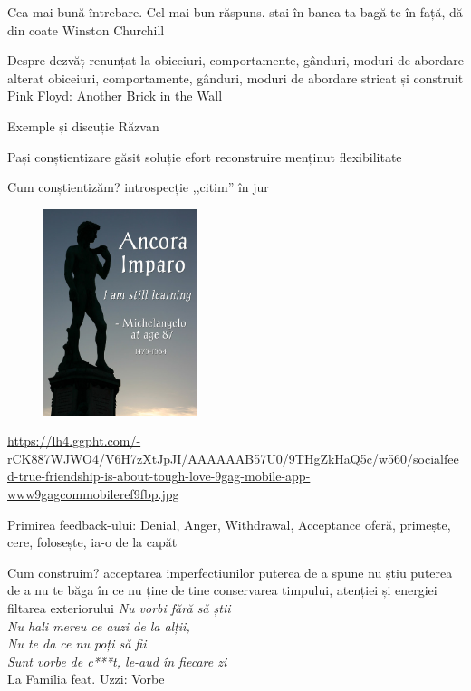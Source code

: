 \documentclass{beamer}
\begin{document}
\begin{frame}{Cea mai bună întrebare. Cel mai bun răspuns.}
  stai în banca ta
  bagă-te în față, dă din coate
  Winston Churchill
\end{frame}

\begin{frame}{Despre dezvăț}
  renunțat la obiceiuri, comportamente, gânduri, moduri de abordare
  alterat obiceiuri, comportamente, gânduri, moduri de abordare
  stricat și construit
  Pink Floyd: Another Brick in the Wall
\end{frame}

\begin{frame}{Exemple și discuție}
  Răzvan
\end{frame}

\begin{frame}{Pași}
  conștientizare
  găsit soluție
  efort
  reconstruire
  menținut flexibilitate
\end{frame}

\begin{frame}{Cum conștientizăm?}
  introspecție
  ,,citim'' în jur
  \begin{figure}
    \centering
    \includegraphics[width=0.4\textwidth]{img/michelangelo-ancora-imparo.jpg}
  \end{figure}
  \begin{center}
    \scriptsize
    \url{https://lh4.ggpht.com/-rCK887WJWO4/V6H7zXtJpJI/AAAAAAB57U0/9THgZkHaQ5c/w560/socialfeed-true-friendship-is-about-tough-love-9gag-mobile-app-www9gagcommobileref9fbp.jpg}
  \end{center}
  Primirea feedback-ului: Denial, Anger, Withdrawal, Acceptance
  oferă, primește, cere, folosește, ia-o de la capăt
\end{frame}

\begin{frame}{Cum construim?}
  acceptarea imperfecțiunilor
  puterea de a spune nu știu
  puterea de a nu te băga în ce nu ține de tine
  conservarea timpului, atenției și energiei
  filtarea exteriorului
  \textit{
  Nu vorbi fără să știi \\
  Nu hali mereu ce auzi de la alții, \\
  Nu te da ce nu poți să fii \\
  Sunt vorbe de c***t, le-aud în fiecare zi \\
  }
  La Familia feat. Uzzi: Vorbe
\end{frame}
\end{document}
